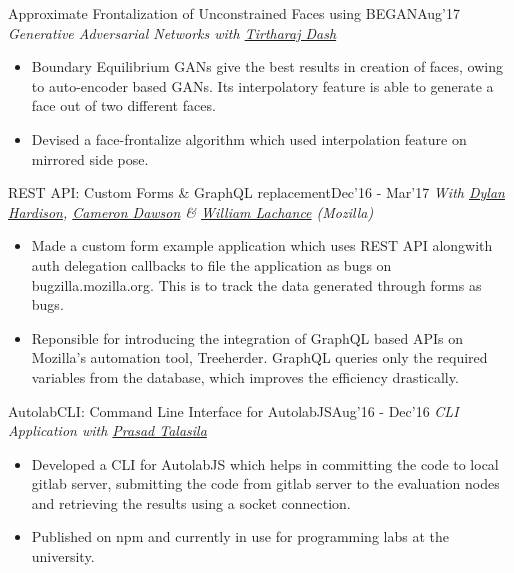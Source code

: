 \begin{projects}
     \project
	{Approximate Frontalization of Unconstrained Faces using BEGAN}{Aug'17}
	{\textit{Generative Adversarial Networks with \href{http://www.bits-pilani.ac.in/goa/tirtharaj/profile}{Tirtharaj Dash}}}
	{\begin{itemize}
      \item Boundary Equilibrium GANs give the best results in creation of faces, owing to auto-encoder based GANs. Its interpolatory feature is able to generate a face out of two different faces.
     \item Devised a face-frontalize algorithm which used interpolation feature on mirrored side pose.
     \end{itemize}}
     \project
	{REST API: Custom Forms \& GraphQL replacement}{Dec'16  - Mar'17}
	{\textit{With \href{https://www.linkedin.com/in/dylanwh}{Dylan Hardison}, \href{https://www.linkedin.com/in/cameron-dawson-a9a41a}{Cameron Dawson} \& \href{https://in.linkedin.com/in/wrlach}{William Lachance} (Mozilla)}}
	{\begin{itemize}
      \item Made a custom form example application which uses REST API alongwith auth delegation callbacks to file the application as bugs on bugzilla.mozilla.org. This is to track the data generated through forms as bugs.
     \item Reponsible for introducing the integration of GraphQL based APIs on Mozilla's automation tool, Treeherder. GraphQL queries only the required variables from the database, which improves the efficiency drastically. 
     \end{itemize}}
     \project
	{AutolabCLI: Command Line Interface for AutolabJS}{Aug'16 - Dec'16}
	{\textit{CLI Application with \href{https://prasadtalasila.wordpress.com/}{Prasad Talasila}}}
	{\begin{itemize}
      \item Developed a CLI for AutolabJS which helps in committing the code to local gitlab server, submitting the code from gitlab server to the evaluation nodes and retrieving the results using a socket connection.
     \item Published on npm and currently in use for programming labs at the university.
     \end{itemize}}
\end{projects}    
\vspace{-3mm}

